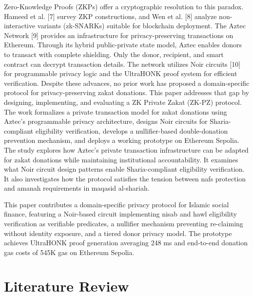 \documentclass[conference]{IEEEtran}
\begin{document}
Zero-Knowledge Proofs (ZKPs) offer a cryptographic resolution to this paradox. Hameed et al. [7] survey ZKP constructions, and Wen et al. [8] analyze non-interactive variants (zk-SNARKs) suitable for blockchain deployment. The Aztec Network [9] provides an infrastructure for privacy-preserving transactions on Ethereum. Through its hybrid public-private state model, Aztec enables donors to transact with complete shielding. Only the donor, recipient, and smart contract can decrypt transaction details. The network utilizes Noir circuits [10] for programmable privacy logic and the UltraHONK proof system for efficient verification. Despite these advances, no prior work has proposed a domain-specific protocol for privacy-preserving zakat donations. This paper addresses that gap by designing, implementing, and evaluating a ZK Private Zakat (ZK-PZ) protocol. The work formalizes a private transaction model for zakat donations using Aztec's programmable privacy architecture, designs Noir circuits for Sharia-compliant eligibility verification, develops a nullifier-based double-donation prevention mechanism, and deploys a working prototype on Ethereum Sepolia. The study explores how Aztec's private transaction infrastructure can be adapted for zakat donations while maintaining institutional accountability. It examines what Noir circuit design patterns enable Sharia-compliant eligibility verification. It also investigates how the protocol satisfies the tension between nafs protection and amanah requirements in maqasid al-shariah.

This paper contributes a domain-specific privacy protocol for Islamic social finance, featuring a Noir-based circuit implementing nisab and hawl eligibility verification as verifiable predicates, a nullifier mechanism preventing re-claiming without identity exposure, and a tiered donor privacy model. The prototype achieves UltraHONK proof generation averaging 248 ms and end-to-end donation gas costs of 545K gas on Ethereum Sepolia.

\section{Literature Review}
\end{document}
